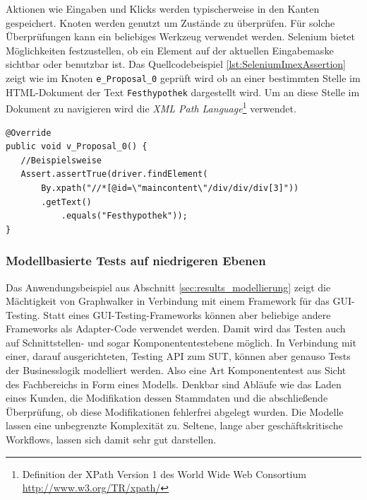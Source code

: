 Aktionen wie Eingaben und Klicks werden typischerweise in den Kanten gespeichert. Knoten werden genutzt um Zustände zu überprüfen. Für solche Überprüfungen kann ein beliebiges Werkzeug verwendet werden. 
Selenium bietet Möglichkeiten festzustellen, ob ein Element auf der aktuellen Eingabemaske sichtbar oder benutzbar ist. Das Quellcodebeispiel \ref{lst:SeleniumImexAssertion} zeigt wie im Knoten \texttt{e\_Proposal\_0} geprüft wird ob an einer bestimmten Stelle im HTML-Dokument der Text \texttt{Festhypothek} dargestellt wird. Um an diese Stelle im Dokument zu navigieren wird die \textit{XML Path Language}\footnote{Definition der XPath Version 1 des World Wide Web Consortium \url{http://www.w3.org/TR/xpath/}} verwendet.

\begin{lstlisting}[caption={Eine Assertion in Selenium auf einem Graphwalker Knoten}, label=lst:SeleniumImexAssertion, float]
@Override
public void v_Proposal_0() {
   //Beispielsweise
   Assert.assertTrue(driver.findElement(
	   By.xpath("//*[@id=\"maincontent\"/div/div/div[3]"))
	   .getText()
           .equals("Festhypothek"));
}
\end{lstlisting}

\subsubsection{Modellbasierte Tests auf niedrigeren Ebenen} Das Anwendungsbeispiel aus Abschnitt \ref{sec:results_modellierung} zeigt die Mächtigkeit von Graphwalker in Verbindung mit einem Framework für das GUI-Testing. Statt eines GUI-Testing-Frameworks können aber beliebige andere Frameworks als Adapter-Code verwendet werden. Damit wird das Testen auch auf Schnittstellen- und sogar Komponententestebene möglich. In Verbindung mit einer, darauf ausgerichteten, Testing API zum \Gls{SUT}, können aber genauso Tests der Businesslogik modelliert werden. Also eine Art Komponententest aus Sicht des Fachbereichs in Form eines Modells. Denkbar sind Abläufe wie das Laden eines Kunden, die Modifikation dessen Stammdaten und die abschließende Überprüfung, ob diese Modifikationen fehlerfrei abgelegt wurden. Die Modelle lassen eine unbegrenzte Komplexität zu. Seltene, lange aber geschäftskritische Workflows, lassen sich damit sehr gut darstellen.

